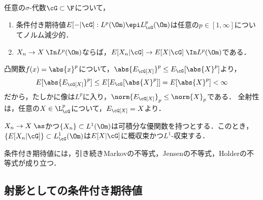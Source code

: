 \documentclass[uplatex,dvipdfmx]{jsreport}
\begin{document}
\begin{corollary}[条件付き期待値の連続性]
    任意の$\sigma$-代数$\cG\subset\F$について，
    \begin{enumerate}
        \item 条件付き期待値$E[-|\cG]:L^p(\Om)\epi L^p_\cG(\Om)$は任意の$p\in[1,\infty]$についてノルム減少的．
        \item $X_n\to X\;\In L^p(\Om)$ならば，$E[X_n|\cG]\to E[X|\cG]\;\In L^p(\Om)$である．
    \end{enumerate}
\end{corollary}
\begin{Proof}
    凸関数$f(x)=\abs{x}^p$について，$\abs{E_\cG[X]}^p\le E_\cG[\abs{X}^p]$より，
    \[E[\abs{E_\cG[X]}^p]\le E[E_\cG[\abs{X}^p]]=E[\abs{X}^p]<\infty\]
    だから，たしかに像は$L^p$に入り，$\norm{E_\cG[X]}_p\le\norm{X}_p$である．
    全射性は，任意の$X\in\L_\cG^p$について，$E_\cG[X]=X$より．
\end{Proof}

\begin{proposition}[Lebesgueの優収束定理]
    $X_n\to X\;\as$かつ$\{X_n\}\subset L^1(\Om)$は可積分な優関数を持つとする．このとき，$\{E[X_n|\cG]\}\subset L^1_\cG(\Om)$は$E[X|\cG]$に概収束かつ$L^1$-収束する．
\end{proposition}

\begin{remarks}
    条件付き期待値には，引き続きMarkovの不等式，Jensenの不等式，Holderの不等式が成り立つ．
\end{remarks}

\subsection{射影としての条件付き期待値}
\end{document}
